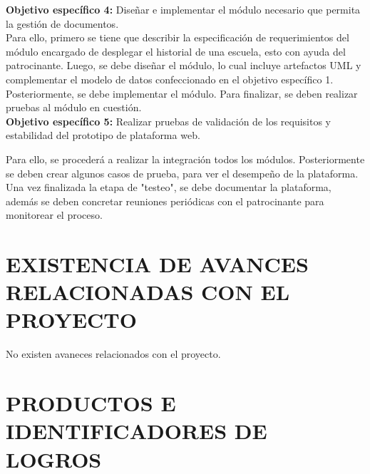 \documentclass[12pt]{article}
\begin{document}
\textbf{Objetivo específico 4:} Diseñar e implementar el módulo necesario que permita la gestión de documentos.\\


Para ello, primero se tiene que describir la especificación de requerimientos del módulo encargado de desplegar el historial de una escuela, esto con ayuda del patrocinante. 
Luego, se debe diseñar el módulo, lo cual incluye artefactos UML y complementar el modelo de datos confeccionado en el objetivo específico 1. Posteriormente, se debe implementar el módulo. Para finalizar, se deben realizar pruebas al módulo en cuestión.
\\

\textbf{Objetivo específico 5:}  Realizar pruebas de validación de los requisitos y estabilidad del prototipo de
plataforma web.

Para ello, se procederá a realizar la integración todos los  módulos. Posteriormente se deben crear algunos casos de prueba, para ver el desempeño de la plataforma. Una vez finalizada la etapa de "testeo", se debe documentar la plataforma, además se deben concretar reuniones periódicas con el patrocinante para monitorear el proceso.
				
				
				
\section{EXISTENCIA DE AVANCES RELACIONADAS CON EL PROYECTO}
	No existen avaneces relacionados con el proyecto.
\section{PRODUCTOS E IDENTIFICADORES DE LOGROS}
\end{document}
